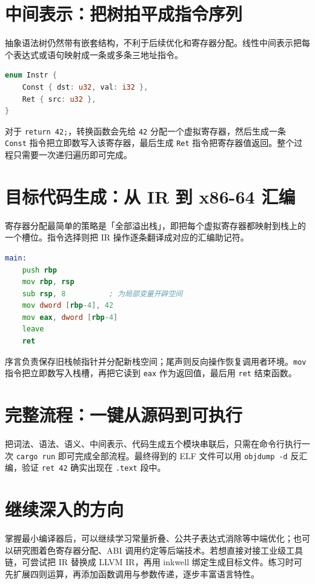 \chapter{中间表示：把树拍平成指令序列}
抽象语法树仍然带有嵌套结构，不利于后续优化和寄存器分配。线性中间表示把每个表达式或语句映射成一条或多条三地址指令。\par
\begin{lstlisting}[language=rust]
enum Instr {
    Const { dst: u32, val: i32 },
    Ret { src: u32 },
}
\end{lstlisting}
对于 \texttt{return 42;}，转换函数会先给 \texttt{42} 分配一个虚拟寄存器，然后生成一条 \texttt{Const} 指令把立即数写入该寄存器，最后生成 \texttt{Ret} 指令把寄存器值返回。整个过程只需要一次递归遍历即可完成。\par
\chapter{目标代码生成：从 IR 到 x86-64 汇编}
寄存器分配最简单的策略是「全部溢出栈」，即把每个虚拟寄存器都映射到栈上的一个槽位。指令选择则把 IR 操作逐条翻译成对应的汇编助记符。\par
\begin{lstlisting}[language=asm]
main:
    push rbp
    mov rbp, rsp
    sub rsp, 8          ; 为局部变量开辟空间
    mov dword [rbp-4], 42
    mov eax, dword [rbp-4]
    leave
    ret
\end{lstlisting}
序言负责保存旧栈帧指针并分配新栈空间；尾声则反向操作恢复调用者环境。\texttt{mov} 指令把立即数写入栈槽，再把它读到 \texttt{eax} 作为返回值，最后用 \texttt{ret} 结束函数。\par
\chapter{完整流程：一键从源码到可执行}
把词法、语法、语义、中间表示、代码生成五个模块串联后，只需在命令行执行一次 \texttt{cargo run} 即可完成全部流程。最终得到的 ELF 文件可以用 \texttt{objdump -d} 反汇编，验证 \texttt{ret 42} 确实出现在 \texttt{.text} 段中。\par
\chapter{继续深入的方向}
掌握最小编译器后，可以继续学习常量折叠、公共子表达式消除等中端优化；也可以研究图着色寄存器分配、ABI 调用约定等后端技术。若想直接对接工业级工具链，可尝试把 IR 替换成 LLVM IR，再用 inkwell 绑定生成目标文件。练习时可先扩展四则运算，再添加函数调用与参数传递，逐步丰富语言特性。\par
